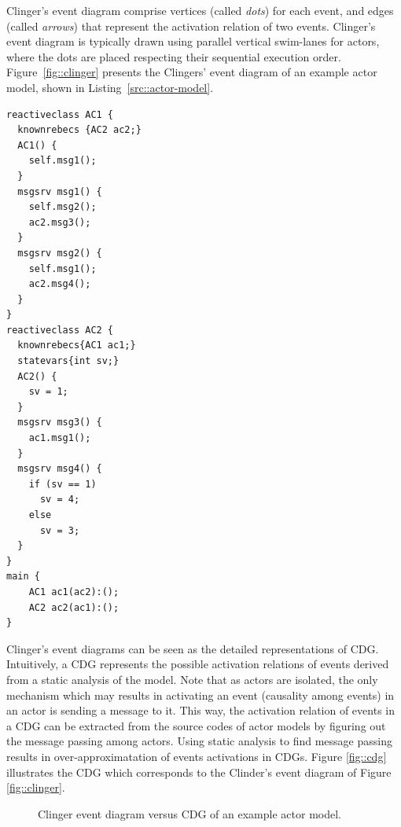 Clinger's event diagram comprise vertices (called \emph{dots}) for each event, and edges (called \emph{arrows}) that represent the activation relation of two events. Clinger's event diagram is typically drawn using parallel vertical swim-lanes for actors, where the dots are placed respecting their sequential execution order. Figure~\ref{fig::clinger} presents the Clingers' event diagram of an example actor model, shown in Listing~\ref{src::actor-model}. 

\begin{lstlisting}[language=rebeca, caption=An example of a simple actor model, label=src::actor-model]
reactiveclass AC1 {
  knownrebecs {AC2 ac2;}
  AC1() {
    self.msg1();
  }
  msgsrv msg1() {
    self.msg2();
    ac2.msg3();
  }
  msgsrv msg2() {
    self.msg1();
    ac2.msg4();
  }
}
reactiveclass AC2 {
  knownrebecs{AC1 ac1;}
  statevars{int sv;}
  AC2() {
    sv = 1;
  }
  msgsrv msg3() {
    ac1.msg1();
  }
  msgsrv msg4() {
    if (sv == 1)
      sv = 4;
    else
      sv = 3;
  }
}
main {
    AC1 ac1(ac2):();
    AC2 ac2(ac1):();
}
\end{lstlisting}

Clinger's event diagrams can be seen as the detailed representations of CDG. Intuitively, a CDG represents the possible activation relations of events derived from a static analysis of the model. Note that as actors are isolated, the only mechanism which may results in activating an event (causality among events) in an actor is sending a message to it. This way, the activation relation of events in a CDG can be extracted from the source codes of actor models by figuring out the message passing among actors. Using static analysis to find message passing results in over-approximatation of events activations in CDGs. Figure \ref{fig::cdg} illustrates the CDG which corresponds to the Clinder's event diagram of Figure \ref{fig::clinger}.

\begin{figure}
\centering
{}
\qquad
{}
\caption{Clinger event diagram versus CDG of an example actor model.}
\label{fig::clinger-cdg}
\end{figure}

